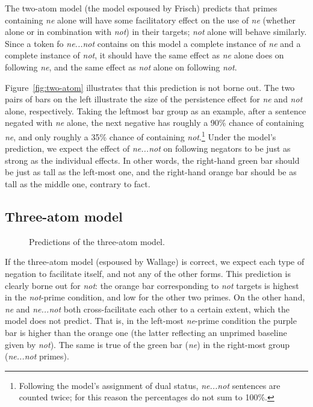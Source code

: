\documentclass{article}
\begin{document}
The two-atom model (the model espoused by Frisch) predicts that primes
containing \emph{ne} alone will have some facilitatory effect on the use
of \emph{ne} (whether alone or in combination with \emph{not}) in their
targets; \emph{not} alone will behave similarly.  Since a token fo
\emph{ne...not} contains on this model a complete instance of \emph{ne}
and a complete instance of \emph{not}, it should have the same effect as
\emph{ne} alone does on following \emph{ne}, and the same effect as
\emph{not} alone on following \emph{not}.

Figure~\ref{fig:two-atom} illustrates that this prediction is not borne
out.  The two pairs of bars on the left illustrate the size of the
persistence effect for \emph{ne} and \emph{not} alone, respectively.
Taking the leftmost bar group as an example, after a sentence negated
with \emph{ne} alone, the next negative has roughly a 90\% chance of
containing \emph{ne}, and only roughly a 35\% chance of containing
\emph{not}.\footnote{Following the model’s assignment of dual status,
    \emph{ne...not} sentences are counted twice; for this reason the
    percentages do not sum to 100\%.}  Under the model’s prediction, we
expect the effect of \emph{ne...not} on following negators to be just as
strong as the individual effects.  In other words, the right-hand green
bar should be just as tall as the left-most one, and the right-hand
orange bar should be as tall as the middle one, contrary to
fact. %

\subsection{Three-atom model}
\label{sec:three-atom-model}

\begin{figure}
    \centering
    
    \caption{Predictions of the three-atom model.}
    \label{fig:three-atom}
\end{figure}

If the three-atom model (espoused by Wallage) is correct, we expect each
type of negation to facilitate itself, and not any of the other forms.
This prediction is clearly borne out for \emph{not}: the orange bar
corresponding to \emph{not} targets is highest in the \emph{not}-prime
condition, and low for the other two primes.  On the other hand,
\emph{ne} and \emph{ne...not} both cross-facilitate each other to a
certain extent, which the model does not predict.  That is, in the
left-most \emph{ne}-prime condition the purple bar is higher than the
orange one (the latter reflecting an unprimed baseline given by
\emph{not}).  The same is true of the green bar (\emph{ne}) in the
right-most group (\emph{ne...not} primes).
\end{document}
